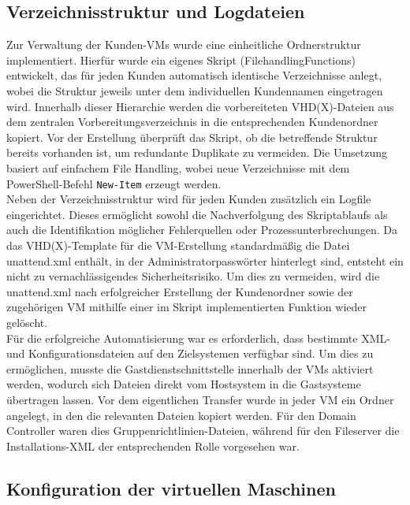 \documentclass[a4paper,12pt]{article}
\begin{document}
\subsection{Verzeichnisstruktur und Logdateien}

Zur Verwaltung der Kunden-VMs wurde eine einheitliche Ordnerstruktur implementiert. 
Hierfür wurde ein eigenes Skript (FilehandlingFunctions) entwickelt, das für jeden Kunden automatisch identische Verzeichnisse anlegt, wobei die Struktur jeweils unter dem individuellen Kundennamen eingetragen wird. 
Innerhalb dieser Hierarchie werden die vorbereiteten VHD(X)-Dateien aus dem zentralen Vorbereitungsverzeichnis in die entsprechenden Kundenordner kopiert. 
Vor der Erstellung überprüft das Skript, ob die betreffende Struktur bereits vorhanden ist, um redundante Duplikate zu vermeiden. 
Die Umsetzung basiert auf einfachem File Handling, wobei neue Verzeichnisse mit dem PowerShell-Befehl \lstinline|New-Item| erzeugt werden.\\

Neben der Verzeichnisstruktur wird für jeden Kunden zusätzlich ein Logfile eingerichtet. 
Dieses ermöglicht sowohl die Nachverfolgung des Skriptablaufs als auch die Identifikation möglicher Fehlerquellen oder Prozessunterbrechungen. 
Da das VHD(X)-Template für die VM-Erstellung standardmä\ss ig die Datei unattend.xml enthält, in der Administratorpasswörter hinterlegt sind, entsteht ein nicht zu vernachlässigendes Sicherheitsrisiko. 
Um dies zu vermeiden, wird die unattend.xml nach erfolgreicher Erstellung der Kundenordner sowie der zugehörigen VM mithilfe einer im Skript implementierten Funktion wieder gelöscht.\\

Für die erfolgreiche Automatisierung war es erforderlich, dass bestimmte XML- und Konfigurationsdateien auf den Zielsystemen verfügbar sind. 
Um dies zu ermöglichen, musste die Gastdienstschnittstelle innerhalb der VMs aktiviert werden, wodurch sich Dateien direkt vom Hostsystem in die Gastsysteme übertragen lassen. 
Vor dem eigentlichen Transfer wurde in jeder VM ein Ordner angelegt, in den die relevanten Dateien kopiert werden. 
Für den Domain Controller waren dies Gruppenrichtlinien-Dateien, während für den Fileserver die Installations-XML der entsprechenden Rolle vorgesehen war.\\

\subsection{Konfiguration der virtuellen Maschinen}
\end{document}

